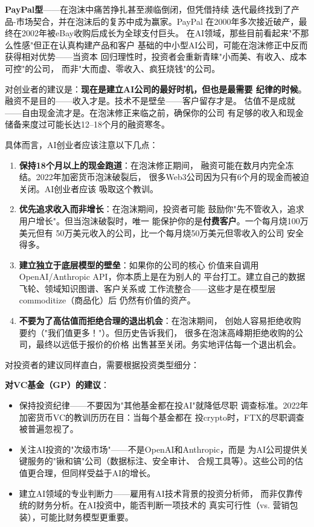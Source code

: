 \textbf{PayPal型}——在泡沫中痛苦挣扎甚至濒临倒闭，但凭借持续
迭代最终找到了产品-市场契合，并在泡沫后的复苏中成为赢家。PayPal
在2000年多次接近破产，最终在2002年被eBay收购后成长为全球支付巨头。
在AI领域，那些目前看起来"不那么性感"但正在认真构建产品和客户
基础的中小型AI公司，可能在泡沫修正中反而获得相对优势——当资本
回归理性时，投资者会重新青睐"小而美、有收入、成本可控"的公司，
而非"大而虚、零收入、疯狂烧钱"的公司。

对创业者的建议是：\textbf{现在是建立AI公司的最好时机，但也是最需要
纪律的时候}。融资不是目的——收入才是。技术不是壁垒——客户留存才是。
估值不是成就——自由现金流才是。在泡沫修正来临之前，确保你的公司
有足够的收入和现金储备来度过可能长达12--18个月的融资寒冬。

具体而言，AI创业者应该注意以下几点：

\begin{enumerate}
  \item \textbf{保持18个月以上的现金跑道}：在泡沫修正期间，
    融资可能在数月内完全冻结。2022年加密货币泡沫破裂后，
    很多Web3公司因为只有6个月的现金而被迫关闭。AI创业者应该
    吸取这个教训。
  \item \textbf{优先追求收入而非增长}：在泡沫期间，投资者可能
    鼓励你"先不管收入，追求用户增长"。但当泡沫破裂时，唯一
    能保护你的是\textbf{付费客户}。一个每月烧100万美元但有
    50万美元收入的公司，比一个每月烧50万美元但零收入的公司
    安全得多。
  \item \textbf{建立独立于底层模型的壁垒}：如果你的公司的核心
    价值来自调用OpenAI/Anthropic API，你本质上是在为别人的
    平台打工。建立自己的数据飞轮、领域知识图谱、客户关系或
    工作流整合——这些才是在模型层commoditize（商品化）后
    仍然有价值的资产。
  \item \textbf{不要为了高估值而拒绝合理的退出机会}：在泡沫期间，
    创始人容易拒绝收购要约（"我们值更多！"）。但历史告诉我们，
    很多在泡沫高峰期拒绝收购的公司，最终以远低于报价的价格
    出售甚至关闭。务实地评估每一个退出机会。
\end{enumerate}

对投资者的建议同样直白，需要根据投资类型细分：

\textbf{对VC基金（GP）的建议}：
\begin{itemize}
  \item 保持投资纪律——不要因为"其他基金都在投AI"就降低尽职
    调查标准。2022年加密货币VC的教训历历在目：当每个基金都在
    投crypto时，FTX的尽职调查被普遍忽视了。
  \item 关注AI投资的"次级市场"——不是OpenAI和Anthropic，而是
    为AI公司提供关键服务的"锹和镐"公司（数据标注、安全审计、
    合规工具等）。这些公司的估值更合理，但同样受益于AI的增长。
  \item 建立AI领域的专业判断力——雇用有AI技术背景的投资分析师，
    而非仅靠传统的财务分析。在AI投资中，能否判断一项技术的
    真实可行性（vs. 营销包装），可能比财务模型更重要。
\end{itemize}

